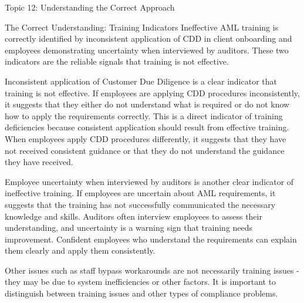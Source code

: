\documentclass[5pt]{beamer}
\begin{document}
	\begin{frame}{Topic 12: Understanding the Correct Approach}
		\begin{block}{\tiny The Correct Understanding: Training Indicators}
			\tiny Ineffective AML training is correctly identified by inconsistent application of CDD in client onboarding and employees demonstrating uncertainty when interviewed by auditors. These two indicators are the reliable signals that training is not effective.
			
			Inconsistent application of Customer Due Diligence is a clear indicator that training is not effective. If employees are applying CDD procedures inconsistently, it suggests that they either do not understand what is required or do not know how to apply the requirements correctly. This is a direct indicator of training deficiencies because consistent application should result from effective training. When employees apply CDD procedures differently, it suggests that they have not received consistent guidance or that they do not understand the guidance they have received.
			
			Employee uncertainty when interviewed by auditors is another clear indicator of ineffective training. If employees are uncertain about AML requirements, it suggests that the training has not successfully communicated the necessary knowledge and skills. Auditors often interview employees to assess their understanding, and uncertainty is a warning sign that training needs improvement. Confident employees who understand the requirements can explain them clearly and apply them consistently.
			
			Other issues such as staff bypass workarounds are not necessarily training issues - they may be due to system inefficiencies or other factors. It is important to distinguish between training issues and other types of compliance problems.
		\end{block}
	\end{frame}
	
\end{document}

